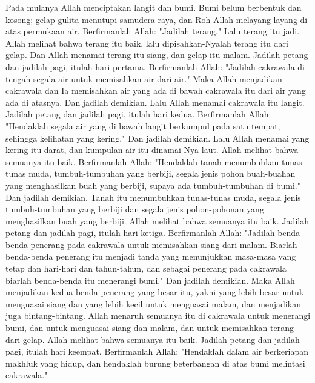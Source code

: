 
\begin{biblechapter}
\verse Pada mulanya Allah menciptakan langit dan bumi.
\verse Bumi belum berbentuk dan kosong; gelap gulita menutupi samudera raya, dan Roh Allah melayang-layang di atas permukaan air.
\verse Berfirmanlah Allah: "Jadilah terang." Lalu terang itu jadi.
\verse Allah melihat bahwa terang itu baik, lalu dipisahkan-Nyalah terang itu dari gelap.
\verse Dan Allah menamai terang itu siang, dan gelap itu malam. Jadilah petang dan jadilah pagi, itulah hari pertama.
\verse Berfirmanlah Allah: "Jadilah cakrawala di tengah segala air untuk memisahkan air dari air."
\verse Maka Allah menjadikan cakrawala dan Ia memisahkan air yang ada di bawah cakrawala itu dari air yang ada di atasnya. Dan jadilah demikian.
\verse Lalu Allah menamai cakrawala itu langit. Jadilah petang dan jadilah pagi, itulah hari kedua.
\verse Berfirmanlah Allah: "Hendaklah segala air yang di bawah langit berkumpul pada satu tempat, sehingga kelihatan yang kering." Dan jadilah demikian.
\verse Lalu Allah menamai yang kering itu darat, dan kumpulan air itu dinamai-Nya laut. Allah melihat bahwa semuanya itu baik.
\verse Berfirmanlah Allah: "Hendaklah tanah menumbuhkan tunas-tunas muda, tumbuh-tumbuhan yang berbiji, segala jenis pohon buah-buahan yang menghasilkan buah yang berbiji, supaya ada tumbuh-tumbuhan di bumi." Dan jadilah demikian.
\verse Tanah itu menumbuhkan tunas-tunas muda, segala jenis tumbuh-tumbuhan yang berbiji dan segala jenis pohon-pohonan yang menghasilkan buah yang berbiji. Allah melihat bahwa semuanya itu baik.
\verse Jadilah petang dan jadilah pagi, itulah hari ketiga.
\verse Berfirmanlah Allah: "Jadilah benda-benda penerang pada cakrawala untuk memisahkan siang dari malam. Biarlah benda-benda penerang itu menjadi tanda yang menunjukkan masa-masa yang tetap dan hari-hari dan tahun-tahun,
\verse dan sebagai penerang pada cakrawala biarlah benda-benda itu menerangi bumi." Dan jadilah demikian.
\verse Maka Allah menjadikan kedua benda penerang yang besar itu, yakni yang lebih besar untuk menguasai siang dan yang lebih kecil untuk menguasai malam, dan menjadikan juga bintang-bintang.
\verse Allah menaruh semuanya itu di cakrawala untuk menerangi bumi,
\verse dan untuk menguasai siang dan malam, dan untuk memisahkan terang dari gelap. Allah melihat bahwa semuanya itu baik.
\verse Jadilah petang dan jadilah pagi, itulah hari keempat.
\verse Berfirmanlah Allah: "Hendaklah dalam air berkeriapan makhluk yang hidup, dan hendaklah burung beterbangan di atas bumi melintasi cakrawala."

\end{biblechapter}

